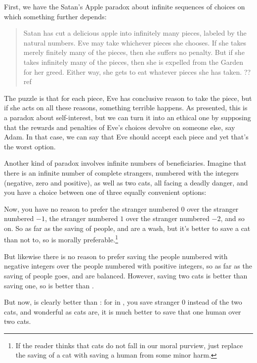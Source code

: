 First, we have the Satan's Apple paradox about infinite sequences of choices on which something
further depends:
\begin{quote}
Satan has cut a delicious apple into infinitely many pieces, labeled by the natural numbers. Eve
may take whichever pieces she chooses. If she takes merely finitely many of the pieces, then she
suffers no penalty. But if she takes infinitely many of the pieces, then she is expelled from the
Garden for her greed. Either way, she gets to eat whatever pieces she has taken. ??ref
\end{quote}
The puzzle is that for each piece, Eve has conclusive reason to take the piece, but if she acts on
all these reasons, something terrible happens. As presented, this is a paradox about self-interest, 
but we can turn it into an ethical one by supposing that the rewards and penalties of Eve's choices 
devolve on someone else, say Adam. In that case, we can say that Eve should accept each piece and yet
that's the worst option.

Another kind of paradox involves infinite numbers of beneficiaries. Imagine that there is an infinite
number of complete strangers, numbered with the integers (negative, zero and positive),
as well as two cats, all facing a deadly danger, and you have a choice between one of three equally convenient options:

Now, you have no reason to prefer
the stranger numbered $0$ over the stranger numbered $-1$, the stranger numbered $1$ over the
stranger numbered $-2$, and so on. So as far as the saving of people,  and 
are a wash, but it's better to save a cat than not to, so  is morally preferable.\footnote{If the
reader thinks that cats do not fall in our moral purview, just replace the saving of a cat with saving a human
from some minor harm.}

But likewise there is no reason to prefer saving the people numbered with negative integers over the
people numbered with positive integers, so as far as the saving of people goes,  and
 are balanced. However, saving two cats is better than saving one, so 
is better than . 

But now,  is clearly better than : for in , you save stranger
$0$ instead of the two cats, and wonderful as cats are, it is much better to save that one human over two cats. 

